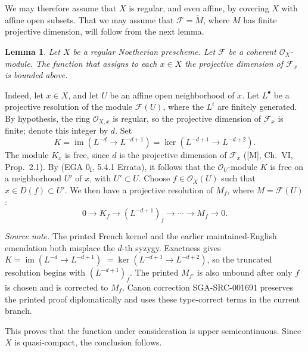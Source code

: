 \documentclass[11pt,a4paper,oneside]{book}
\providecommand{\cF}{\mathcal F}
\providecommand{\cO}{\mathcal O}
\theoremstyle{plain}
\newtheorem{lemma}{Lemma}[section]
\theoremstyle{definition}
\theoremstyle{remark}
\begin{document}
We may therefore assume that $X$ is regular, and even affine, by covering
$X$ with affine open subsets. That we may assume that $\cF=\widetilde M$, where
$M$ has finite projective dimension, will follow from the next lemma.

\begin{lemma}\label{VIII.2.4}
Let $X$ be a regular Noetherian prescheme. Let $\cF$ be a coherent
$\mathcal O_X$-module. The function that assigns to each $x\in X$ the
projective dimension of $\cF_x$ is bounded above.
\end{lemma}


\setcounter{equation}{1}
\medskip
Indeed, let $x\in X$, and let $U$ be an affine open neighborhood of $x$.
Let $L^\bullet$ be a projective resolution of the module $\cF(U)$, where the
$L^i$ are finitely generated. By hypothesis, the ring $\cO_{X,x}$ is regular,
so the projective dimension of $\cF_x$ is finite; denote this integer by $d$.
Set
\[
  K=\operatorname{im}(L^{-d}\longrightarrow L^{-d+1})=\ker(L^{-d+1}\longrightarrow L^{-d+2}).
\]
The module $K_x$ is free, since $d$ is the projective dimension of $\cF_x$
([M], Ch.~VI, Prop.~2.1). By (EGA $0_{\mathrm I}$, 5.4.1 Errata), it follows
that the $\cO_U$-module $\widetilde K$ is free on a neighborhood $U'$ of $x$,
with $U'\subset U$. Choose $f\in\cO_X(U)$ such that
$x\in D(f)\subset U'$. We then have a projective resolution of $M_f$, where
$M=\cF(U)$:
\[
  0\longrightarrow K_f\longrightarrow (L^{-d+1})_f\longrightarrow
  \cdots\longrightarrow M_f\longrightarrow 0.
\]

\noindent\emph{Source note.} The printed French kernel and the earlier
maintained-English emendation both misplace the $d$-th syzygy. Exactness
gives $K=\operatorname{im}(L^{-d}\to L^{-d+1})$
$=\ker(L^{-d+1}\to L^{-d+2})$, so the truncated resolution begins with
$(L^{-d+1})_f$. The printed $M_{f'}$ is also unbound after only $f$ is
chosen and is corrected to $M_f$. Canon correction SGA-SRC-001691
preserves the printed proof diplomatically and uses these type-correct
terms in the current branch.

This proves that the function under consideration is upper semicontinuous.
Since $X$ is quasi-compact, the conclusion follows.

\end{document}
